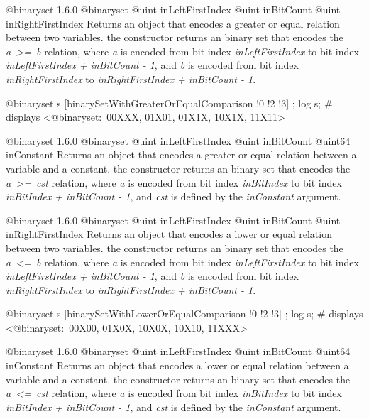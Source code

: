 {@binaryset}
{1.6.0}
{@binaryset}
{@uint inLeftFirstIndex}
{@uint inBitCount}
{@uint inRightFirstIndex}
{Returns an  object that encodes a greater or equal relation between two variables.}
{the constructor returns an binary set that encodes the \emph{a~>=~b} relation, where \emph{a} is encoded from bit index \emph{inLeftFirstIndex} to bit index \emph{inLeftFirstIndex  + inBitCount - 1}, and \emph{b} is encoded from bit index \emph{inRightFirstIndex} to \emph{inRightFirstIndex + inBitCount - 1}.}

\exempleDeuxLignes
{}
{@binaryset s [binarySetWithGreaterOrEqualComparison !0 !2 !3] ;}
{log s; \# displays <@binaryset:~00XXX, 01X01, 01X1X, 10X1X, 11X11>}





{@binaryset}
{1.6.0}
{@binaryset}
{@uint inLeftFirstIndex}
{@uint inBitCount}
{@uint64 inConstant}
{Returns an  object that encodes a greater or equal relation between a variable and a constant.}
{the constructor returns an binary set that encodes the \emph{a~>=~cst} relation, where \emph {a} is encoded from bit index \emph{inBitIndex} to bit index \emph{inBitIndex  + inBitCount - 1}, and \emph{cst} is defined by the \emph{inConstant} argument.}





{@binaryset}
{1.6.0}
{@binaryset}
{@uint inLeftFirstIndex}
{@uint inBitCount}
{@uint inRightFirstIndex}
{Returns an  object that encodes a lower or equal relation between two variables.}
{the constructor returns an binary set that encodes the \emph{a~<=~b} relation, where \emph{a} is encoded from bit index \emph{inLeftFirstIndex} to bit index \emph{inLeftFirstIndex  + inBitCount - 1}, and \emph{b} is encoded from bit index \emph{inRightFirstIndex} to \emph{inRightFirstIndex + inBitCount - 1}.}

\exempleDeuxLignes
{}
{@binaryset s [binarySetWithLowerOrEqualComparison !0 !2 !3] ;}
{log s; \# displays <@binaryset:~00X00, 01X0X, 10X0X, 10X10, 11XXX>}





{@binaryset}
{1.6.0}
{@binaryset}
{@uint inLeftFirstIndex}
{@uint inBitCount}
{@uint64 inConstant}
{Returns an  object that encodes a lower or equal relation between a variable and a constant.}
{the constructor returns an binary set that encodes the \emph{a~<=~cst} relation, where \emph {a} is encoded from bit index \emph{inBitIndex} to bit index \emph{inBitIndex  + inBitCount - 1}, and \emph{cst} is defined by the \emph{inConstant} argument.}





